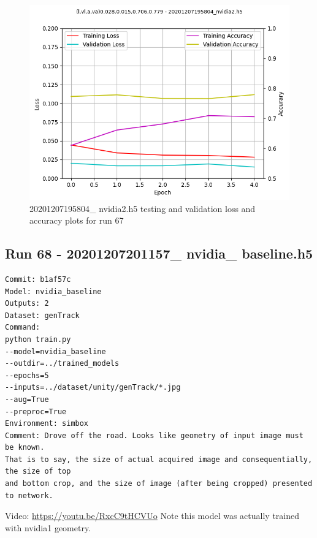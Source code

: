 \begin{figure}[h!]
\centering
\includegraphics[width=\textwidth]{Figures/20201207195804_nvidia2_accuracy.png}
\caption{20201207195804\_ nvidia2.h5 testing and validation loss and accuracy plots for run 67}
\label{fig:20201207195804_nvidia2_accuracy}
\end{figure}

\subsection{Run 68 - 20201207201157\_ nvidia\_ baseline.h5}
\label{app_res:68}
\begin{verbatim}
Commit: b1af57c
Model: nvidia_baseline
Outputs: 2
Dataset: genTrack
Command:
python train.py
--model=nvidia_baseline
--outdir=../trained_models
--epochs=5
--inputs=../dataset/unity/genTrack/*.jpg
--aug=True
--preproc=True
Environment: simbox
Comment: Drove off the road. Looks like geometry of input image must be known.  
That is to say, the size of actual acquired image and consequentially, the size of top 
and bottom crop, and the size of image (after being cropped) presented to network.
\end{verbatim}
Video: \url{https://youtu.be/RxcC9tHCVUo}
Note this model was actually trained with nvidia1 geometry.


